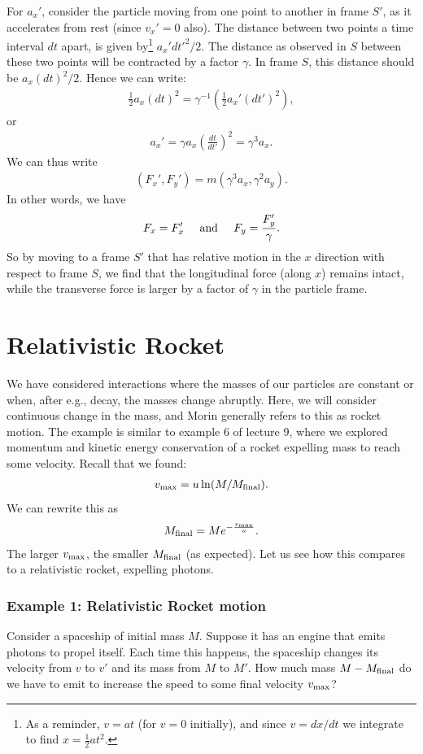 \documentclass[12pt]{article}
\newcommand{\be}{\begin{eqnarray}}
\newcommand{\ee}{\end{eqnarray}}
\begin{document}
For $a_x'$, consider the particle moving from one point to another in frame $S'$, as it accelerates from rest (since $v_x' = 0$ also). The distance between two points a time interval $dt$ apart, is given by\footnote{As a reminder, $v = at$ (for $v =0$ initially), and since $v = dx/dt$ we integrate to find $x = \frac{1}{2} a t^2$. }  $a_x' dt'^2/2$. The distance as observed in $S$ between these two points will be contracted by a factor $\gamma$. In frame $S$, this distance should be $a_x(dt)^2/2$. Hence we can write:
\be
\frac{1}{2} a_x (dt)^2 = \gamma^{-1} \left(\frac{1}{2} a_x' (dt')^2\right),
\ee
or 
\be
a_x' = \gamma a_x \left(\frac{dt}{dt'}\right)^2 = \gamma^3 a_x.
\ee
We can thus write
\be
(F_x',F_y') = m(\gamma^3a_x,\gamma^2a_y).
\ee
In other words, we have 
\be
F_x = F_x'\;\;\;\;\;{\rm and}\;\;\;\;\; F_y = \frac{F_y'}{\gamma}.
\ee
So by moving to a frame $S'$ that has relative motion in the $x$ direction with respect to frame $S$, we find that the longitudinal force (along $x$) remains intact, while the transverse force is larger by a factor of $\gamma$ in the particle frame.  

\section{Relativistic Rocket}\label{sec:rocket}

We have considered interactions where the masses of our particles are constant or when, after e.g., decay, the masses change abruptly. Here, we will consider continuous change in the mass, and Morin generally refers to this as rocket motion. The example is similar to example 6 of lecture 9, where we explored momentum and kinetic energy conservation of a rocket expelling mass to reach some velocity. Recall that we found:
\be
v_{\rm max} = u \ln (M/M_{\rm final}). 
\ee
We can rewrite this as 
\be
M_{\rm final} = Me^{-\frac{v_{\rm max}}{u}}.
\ee
The larger $v_{\rm max}$, the smaller $M_{\rm final}$ (as expected). Let us see how this compares to a relativistic rocket, expelling photons.  

\subsubsection*{Example 1: Relativistic Rocket motion}
Consider a spaceship of initial mass $M$. Suppose it has an engine that emits photons to propel itself. Each time this happens, the spaceship changes its velocity from  $v$ to $v'$ and its mass from $M$ to $M'$. How much mass $M-M_{\rm final}$ do we have to emit to increase the speed to some final velocity $v_{\rm max}$?
\end{document}
